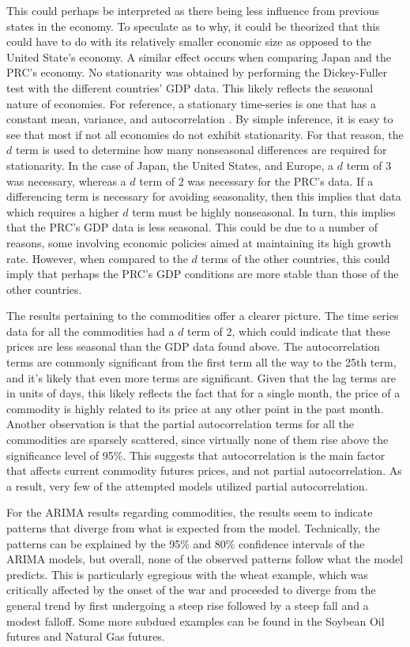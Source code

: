 \documentclass[11pt,regno]{amsart}
\theoremstyle{plain}
\numberwithin{equation}{section}
\begin{document}
This could perhaps be interpreted as there being less influence from previous states in the economy. To speculate as to why, it could be theorized that this could have to do with its relatively smaller economic size as opposed to the United State's economy. A similar effect occurs when comparing Japan and the PRC's economy. No stationarity was obtained by performing the Dickey-Fuller test with the different countries' GDP data. This likely reflects the seasonal nature of economies. For reference, a stationary time-series is one that has a constant mean, variance, and autocorrelation \cite{stationarity}. By simple inference, it is easy to see that most if not all economies do not exhibit stationarity. For that reason, the $d$ term is used to determine how many nonseasonal differences are required for stationarity. In the case of Japan, the United States, and Europe, a $d$ term of 3 was necessary, whereas a $d$ term of 2 was necessary for the PRC's data. If a differencing term is necessary for avoiding seasonality, then this implies that data which requires a higher $d$ term must be highly nonseasonal. In turn, this implies that the PRC's GDP data is less seasonal. This could be due to a number of reasons, some involving economic policies aimed at maintaining its high growth rate. However, when compared to the $d$ terms of the other countries, this could imply that perhaps the PRC's GDP conditions are more stable than those of the other countries.  

The results pertaining to the commodities offer a clearer picture. The time series data for all the commodities had a $d$ term of 2, which could indicate that these prices are less seasonal than the GDP data found above. The autocorrelation terms are commonly significant from the first term all the way to the 25th term, and it's likely that even more terms are significant. Given that the lag terms are in units of days, this likely reflects the fact that for a single month, the price of a commodity is highly related to its price at any other point in the past month. Another observation is that the partial autocorrelation terms for all the commodities are sparsely scattered, since virtually none of them rise above the significance level of 95\%. This suggests that autocorrelation is the main factor that affects current commodity futures prices, and not partial autocorrelation. As a result, very few of the attempted models utilized partial autocorrelation. 

For the ARIMA results regarding commodities, the results seem to indicate patterns that diverge from what is expected from the model. Technically, the patterns can be explained by the 95\% and 80\% confidence intervals of the ARIMA models, but overall, none of the observed patterns follow what the model predicts. This is particularly egregious with the wheat example, which was critically affected by the onset of the war and proceeded to diverge from the general trend by first undergoing a steep rise followed by a steep fall and a modest falloff. Some more subdued examples can be found in the Soybean Oil futures and Natural Gas futures.
\end{document}
